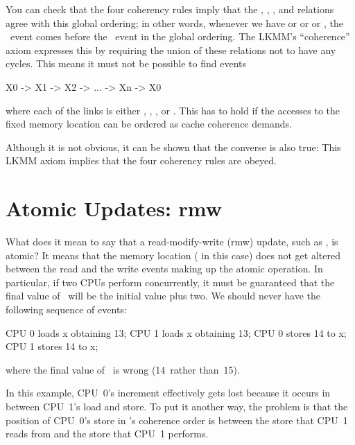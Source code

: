 You can check that the four coherency rules imply that the , , ,
and  relations agree with this global ordering; in other words,
whenever we have  or  or  or , the
~event comes before the ~event in the global ordering.
The LKMM's ``coherence'' axiom expresses this by requiring the union of these
relations not to have any cycles.
This means it must not be possible to find events

\begin{VerbatimU}
	X0 -> X1 -> X2 -> ... -> Xn -> X0
\end{VerbatimU}

\noindent%
where each of the links is either , , , or .
This has to hold if the accesses to the fixed memory location can be
ordered as cache coherence demands.

Although it is not obvious, it can be shown that the converse is also
true:
This LKMM axiom implies that the four coherency rules are obeyed.


\section{Atomic Updates: rmw}
\label{sec:docs:explanation:Atomic Updates: rmw}

What does it mean to say that a read-modify-write (rmw) update, such
as , is atomic?
It means that the memory location ( in this case) does not get
altered between the read and the write events making up the atomic
operation.
In particular, if two CPUs perform  concurrently,
it must be guaranteed that the final value of~ will be the
initial value plus two.
We should never have the following sequence of events:

\begin{VerbatimU}
	CPU 0 loads x obtaining 13;
	                                CPU 1 loads x obtaining 13;
	CPU 0 stores 14 to x;
	                                CPU 1 stores 14 to x;
\end{VerbatimU}

\noindent%
where the final value of~ is wrong (14~rather than~15).

In this example, CPU~0's increment effectively gets lost because it
occurs in between CPU~1's load and store.
To put it another way, the problem is that the position of CPU~0's
store in 's coherence order is between the store that CPU~1
reads from and the store that CPU~1 performs.

